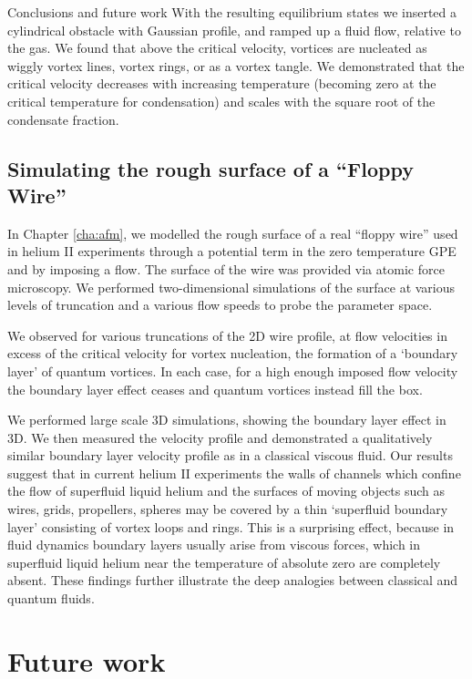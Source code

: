 \begin{chapter}{\label{cha:conc}Conclusions and future work}
With the resulting equilibrium states we inserted a cylindrical obstacle with Gaussian profile, and ramped up a fluid flow, relative to the gas.  We found that above the critical velocity, vortices are nucleated as wiggly vortex lines, vortex rings, or as a vortex tangle. We demonstrated that the critical velocity decreases with increasing temperature (becoming zero at the critical temperature for condensation) and scales with the square root of the condensate fraction.

\subsection{Simulating the rough surface of a ``Floppy Wire''}
In Chapter \ref{cha:afm}, we modelled the rough surface of a real ``floppy wire'' used in helium II experiments through a potential term in the zero temperature GPE and by imposing a flow. The surface of the wire was provided via atomic force microscopy. We performed two-dimensional simulations of the surface at various levels of truncation and a various flow speeds to probe the parameter space.

We observed for various truncations of the 2D wire profile, at flow velocities in excess of the critical velocity for vortex nucleation, the formation of a `boundary layer' of quantum vortices. In each case, for a high enough imposed flow velocity the boundary layer effect ceases and quantum vortices instead fill the box.

We performed large scale 3D simulations, showing the boundary layer effect in 3D. We then measured the velocity profile and demonstrated a qualitatively similar boundary layer velocity profile as in a classical viscous fluid.  Our results suggest that in current helium II experiments the walls of channels which confine the flow of superfluid liquid helium and the surfaces of moving objects such as wires, grids, propellers, spheres may be covered by a thin `superfluid boundary layer' consisting of vortex loops and rings. This is a surprising effect, because in fluid dynamics boundary layers usually arise from viscous forces, 
which in superfluid liquid helium near the temperature of
absolute zero are completely absent.  These findings further illustrate the deep analogies between classical and quantum fluids.

\section{Future work} 

\end{chapter}
